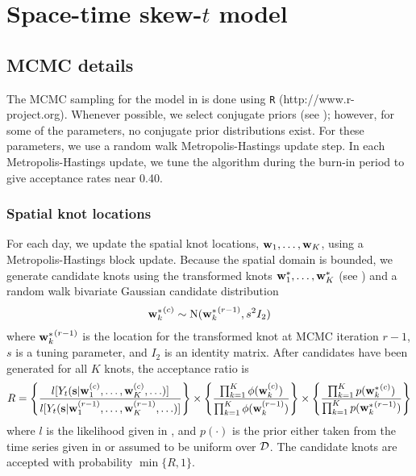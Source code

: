 \chapter{Space-time skew-$t$ model}
\section{MCMC details} \label{sta:mcmc}
The MCMC sampling for the model in  is done using {\tt R} (http://www.r-project.org). Whenever possible, we select conjugate priors (see ); however, for some of the parameters, no conjugate prior distributions exist.
For these parameters, we use a random walk Metropolis-Hastings update step.
In each Metropolis-Hastings update, we tune the algorithm during the burn-in period to give acceptance rates near 0.40.

\subsection*{Spatial knot locations}
For each day, we update the spatial knot locations, $\mathbf{w}_1, \ldots, \mathbf{w}_K$, using a Metropolis-Hastings block update.
Because the spatial domain is bounded, we generate candidate knots using the transformed knots $\mathbf{w}^*_1, \ldots, \mathbf{w}^*_K$ (see ) and a random walk bivariate Gaussian candidate distribution
\begin{align*}
  {\ensuremath{\mathbf{w}}^*_k}^{(c)} \sim \text{N}({\mathbf{w}^*_k}^{(r - 1)}, s^2 I_2)
\end{align*}
where ${\mathbf{w}^*_k}^{(r - 1)}$ is the location for the transformed knot at MCMC iteration $r - 1$, $s$ is a tuning parameter, and $I_2$ is an identity matrix.
After candidates have been generated for all $K$ knots, the acceptance ratio is
\begin{align*}
  R = \left\{ \frac{ l[ Y_t(\mathbf{s} | \mathbf{w}_1^{(c)}, \ldots, \mathbf{w}_K^{(c)}, \ldots)] }{l[ Y_t(\mathbf{s} | \mathbf{w}_1^{(r - 1)}, \ldots, \mathbf{w}_K^{(r - 1)}, \ldots)]} \right\} \times \left\{ \frac{ \prod_{k = 1}^{K}\phi(\mathbf{w}_k^{(c)})}{ \prod_{k = 1}^{K}\phi(\mathbf{w}_k^{(r - 1)})} \right\} \times \left\{ \frac{ \prod_{k = 1}^{K} p({\mathbf{w}^*_k}^{(c)})}{ \prod_{k = 1}^{K} p({\mathbf{w}^*_k}^{(r - 1)})}\right\}
\end{align*}
where $l$ is the likelihood given in , and $p(\cdot)$ is the prior either taken from the time series given in  or assumed to be uniform over ${\cal D}$.
The candidate knots are accepted with probability $\min\{R, 1\}$.

